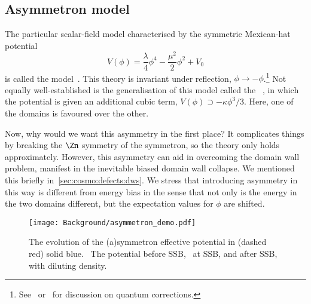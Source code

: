     \subsection{Asymmetron model}\label{sec:cosmo:quintessence:asymmetron}
    The particular scalar-field model characterised by the symmetric Mexican-hat potential
    \begin{equation}
        V(\phi) = \frac{\lambda}{4} \phi^4  - \frac{\mu^2}{2} \phi^2 + V_0
    \end{equation}
    is called the  model~\citep{hinterbichlerSymmetronCosmology2011}. This theory is invariant under reflection, $\phi\to -\phi$.\footnote{
        See~\citet[~11,~12,~20 \&~22]{peskinIntroductionQuantumField1995} or~\citet[~7]{kolbEarlyUniverse1990} for discussion on quantum corrections.
    } %
    Not equally well-established is the generalisation of this model called the ~\citep{perivolaropoulosGravitationalTransitionsExplicitly2022}, in which the potential is given an additional cubic term, $V(\phi)\supset -\kappa\phi^3/3 $. Here, one of the domains is favoured over the other. 

    Now, why would we want this asymmetry in the first place? It complicates things by breaking the $\Zn$ symmetry of the symmetron, so the theory only holds approximately. However, this asymmetry can aid in overcoming the domain wall problem, manifest in the inevitable biased domain wall collapse. We mentioned this briefly in~\cref{sec:cosmo:defects:dws}. %
    We stress that introducing asymmetry in this way is different from energy bias in the sense that not only is the energy in the two domains different, but the expectation values for $\phi$ are shifted.

    \begin{figure}[h]
        \centering
        {\texttt{[image: Background/asymmetron\_demo.pdf]}}
        \caption{The evolution of the (a)symmetron effective potential in (dashed red) solid blue. ~The potential before SSB, ~at SSB, and  after SSB, with diluting density.
        }
        \label{fig:cosmo:quintessence:asymmetron_demo}
    \end{figure}

